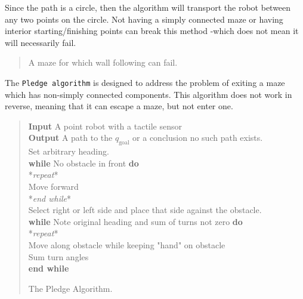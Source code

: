 Since the path is a circle, then the algorithm will transport the robot
between any two points on the circle. Not having a simply connected maze
or having interior starting/finishing points can break this method
-which does not mean it will necessarily fail.

\begin{quote}
A maze for which wall following can fail.
\end{quote}

The \texttt{Pledge\ algorithm} is designed to address the problem of
exiting a maze which has non-simply connected components. This algorithm
does not work in reverse, meaning that it can escape a maze, but not
enter one.

\begin{quote}
\textbf{Input} A point robot with a tactile sensor\\
\textbf{Output} A path to the \(q_{\text{goal}}\) or a conclusion no
such path exists.\\
Set arbitrary heading.\\
\textbf{while} No obstacle in front \textbf{do}\\
\hspace*{0.333em}\hspace*{0.333em}*\emph{repeat}*\\
\hspace*{0.333em}\hspace*{0.333em}\hspace*{0.333em}\hspace*{0.333em}Move
forward\\
\hspace*{0.333em}\hspace*{0.333em}*\emph{end while}*\\
Select right or left side and place that side against the obstacle.\\
\textbf{while} Note original heading and sum of turns not zero
\textbf{do}\\
\hspace*{0.333em}\hspace*{0.333em}*\emph{repeat}*\\
\hspace*{0.333em}\hspace*{0.333em}\hspace*{0.333em}\hspace*{0.333em}Move
along obstacle while keeping "hand" on obstacle\\
\hspace*{0.333em}\hspace*{0.333em}\hspace*{0.333em}\hspace*{0.333em}Sum
turn angles\\
\textbf{end while}

The Pledge Algorithm.
\end{quote}

